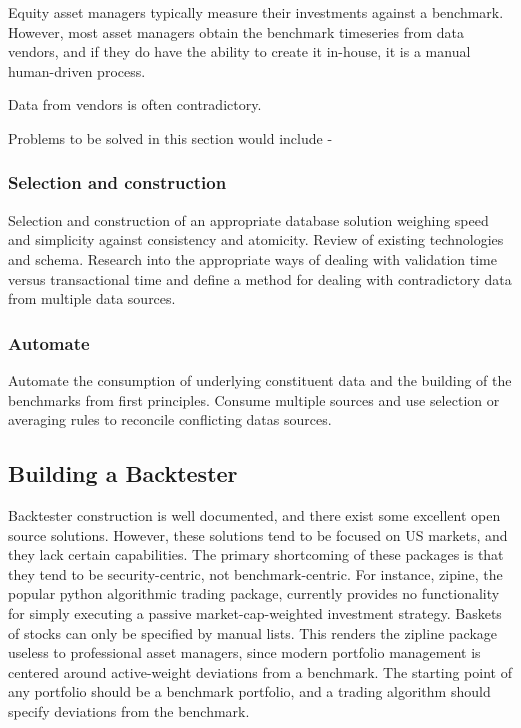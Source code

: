 \documentclass[11pt,preprint, authoryear]{elsarticle}
\numberwithin{equation}{section}
\numberwithin{figure}{section}
\numberwithin{table}{section}
\begin{document}
Equity asset managers typically measure their investments against a
benchmark. However, most asset managers obtain the benchmark timeseries
from data vendors, and if they do have the ability to create it
in-house, it is a manual human-driven process.

Data from vendors is often contradictory.

Problems to be solved in this section would include -

\subsubsection{Selection and
construction}\label{selection-and-construction}

Selection and construction of an appropriate database solution weighing
speed and simplicity against consistency and atomicity. Review of
existing technologies and schema. Research into the appropriate ways of
dealing with validation time versus transactional time and define a
method for dealing with contradictory data from multiple data sources.

\subsubsection{Automate}\label{automate}

Automate the consumption of underlying constituent data and the building
of the benchmarks from first principles. Consume multiple sources and
use selection or averaging rules to reconcile conflicting datas sources.

\subsection{Building a Backtester}\label{building-a-backtester}

Backtester construction is well documented, and there exist some
excellent open source solutions. However, these solutions tend to be
focused on US markets, and they lack certain capabilities. The primary
shortcoming of these packages is that they tend to be security-centric,
not benchmark-centric. For instance, zipine, the popular python
algorithmic trading package, currently provides no functionality for
simply executing a passive market-cap-weighted investment strategy.
Baskets of stocks can only be specified by manual lists. This renders
the zipline package useless to professional asset managers, since modern
portfolio management is centered around active-weight deviations from a
benchmark. The starting point of any portfolio should be a benchmark
portfolio, and a trading algorithm should specify deviations from the
benchmark.
\end{document}
